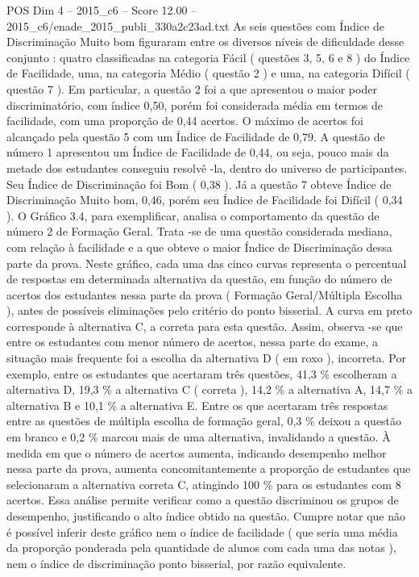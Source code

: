 \begin{textsample}{POS Dim 4 – 2015\_c6 – Score 12.00 – 2015\_c6/enade\_2015\_publi\_330a2c23ad.txt}
As seis questões com Índice de Discriminação Muito bom figuraram entre os diversos níveis de dificuldade desse conjunto : quatro classificadas na categoria Fácil ( questões 3, 5, 6 e 8 ) do Índice de Facilidade, uma, na categoria Médio ( questão 2 ) e uma, na categoria Difícil ( questão 7 ).
Em particular, a questão 2 foi a que apresentou o maior poder discriminatório, com índice 0,50, porém foi considerada média em termos de facilidade, com uma proporção de 0,44 acertos.
O máximo de acertos foi alcançado pela questão 5 com um Índice de Facilidade de 0,79.
A questão de número 1 apresentou um Índice de Facilidade de 0,44, ou seja, pouco mais da metade dos estudantes conseguiu resolvê -la, dentro do universo de participantes.
Seu Índice de Discriminação foi Bom ( 0,38 ).
Já a questão 7 obteve Índice de Discriminação Muito bom, 0,46, porém seu Índice de Facilidade foi Difícil ( 0,34 ).
O Gráfico 3.4, para exemplificar, analisa o comportamento da questão de número 2 de Formação Geral.
Trata -se de uma questão considerada mediana, com relação à facilidade e a que obteve o maior Índice de Discriminação dessa parte da prova.
Neste gráfico, cada uma das cinco curvas representa o percentual de respostas em determinada alternativa da questão, em função do número de acertos dos estudantes nessa parte da prova ( Formação Geral/Múltipla Escolha ), antes de possíveis eliminações pelo critério do ponto bisserial.
A curva em preto corresponde à alternativa C, a correta para esta questão.
Assim, observa -se que entre os estudantes com menor número de acertos, nessa parte do exame, a situação mais frequente foi a escolha da alternativa D ( em roxo ), incorreta.
Por exemplo, entre os estudantes que acertaram três questões, 41,3 \% escolheram a alternativa D, 19,3 \% a alternativa C ( correta ), 14,2 \% a alternativa A, 14,7 \% a alternativa B e 10,1 \% a alternativa E.
Entre os que acertaram três respostas entre as questões de múltipla escolha de formação geral, 0,3 \% deixou a questão em branco e 0,2 \% marcou mais de uma alternativa, invalidando a questão.
À medida em que o número de acertos aumenta, indicando desempenho melhor nessa parte da prova, aumenta concomitantemente a proporção de estudantes que selecionaram a alternativa correta C, atingindo 100 \% para os estudantes com 8 acertos.
Essa análise permite verificar como a questão discriminou os grupos de desempenho, justificando o alto índice obtido na questão.
Cumpre notar que não é possível inferir deste gráfico nem o índice de facilidade ( que seria uma média da proporção ponderada pela quantidade de alunos com cada uma das notas ), nem o índice de discriminação ponto bisserial, por razão equivalente.

\end{textsample}
